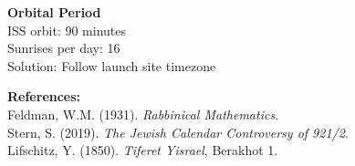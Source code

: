 \begin{technical}
\textbf{Orbital Period}\\[0.3em]
ISS orbit: 90 minutes\\
Sunrises per day: 16\\
Solution: Follow launch site timezone

\vspace{0.5em}
\textbf{References:}\\
{\footnotesize
Feldman, W.M. (1931). \textit{Rabbinical Mathematics}.\\
Stern, S. (2019). \textit{The Jewish Calendar Controversy of 921/2}.\\
Lifschitz, Y. (1850). \textit{Tiferet Yisrael}, Berakhot 1.
}
\end{technical}